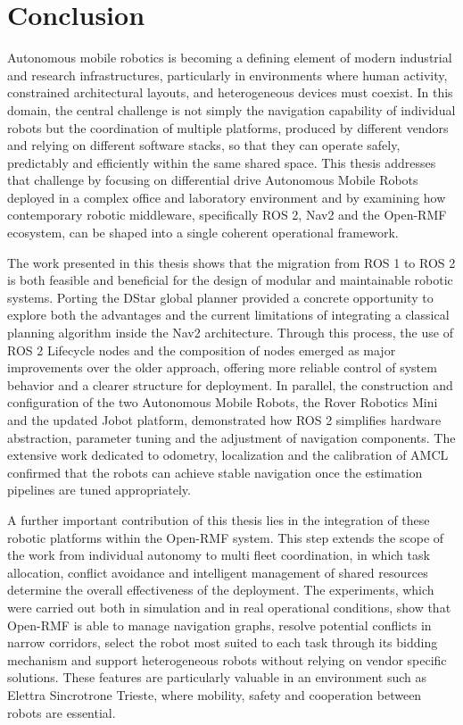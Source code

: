 \chapter{Conclusion}
Autonomous mobile robotics is becoming a defining element of modern industrial and research infrastructures, particularly in environments where human activity, constrained architectural layouts, and heterogeneous devices must coexist. In this domain, the central challenge is not simply the navigation capability of individual robots but the coordination of multiple platforms, produced by different vendors and relying on different software stacks, so that they can operate safely, predictably and efficiently within the same shared space. This thesis addresses that challenge by focusing on differential drive Autonomous Mobile Robots deployed in a complex office and laboratory environment and by examining how contemporary robotic middleware, specifically ROS 2, Nav2 and the Open-RMF ecosystem, can be shaped into a single coherent operational framework.

The work presented in this thesis shows that the migration from ROS 1 to ROS 2 is both feasible and beneficial for the design of modular and maintainable robotic systems. Porting the DStar global planner provided a concrete opportunity to explore both the advantages and the current limitations of integrating a classical planning algorithm inside the Nav2 architecture. Through this process, the use of ROS 2 Lifecycle nodes and the composition of nodes emerged as major improvements over the older approach, offering more reliable control of system behavior and a clearer structure for deployment. In parallel, the construction and configuration of the two Autonomous Mobile Robots, the Rover Robotics Mini and the updated Jobot platform, demonstrated how ROS 2 simplifies hardware abstraction, parameter tuning and the adjustment of navigation components. The extensive work dedicated to odometry, localization and the calibration of AMCL confirmed that the robots can achieve stable navigation once the estimation pipelines are tuned appropriately.

A further important contribution of this thesis lies in the integration of these robotic platforms within the Open-RMF system. This step extends the scope of the work from individual autonomy to multi fleet coordination, in which task allocation, conflict avoidance and intelligent management of shared resources determine the overall effectiveness of the deployment. The experiments, which were carried out both in simulation and in real operational conditions, show that Open-RMF is able to manage navigation graphs, resolve potential conflicts in narrow corridors, select the robot most suited to each task through its bidding mechanism and support heterogeneous robots without relying on vendor specific solutions. These features are particularly valuable in an environment such as Elettra Sincrotrone Trieste, where mobility, safety and cooperation between robots are essential.

